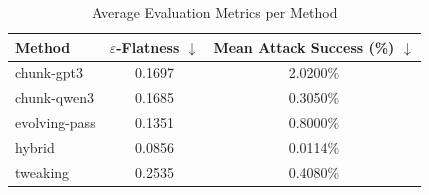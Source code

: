 \begin{table}[h]
\centering
\caption{Average Evaluation Metrics per Method}
\label{tab:honeyword-metrics}
\begin{tabular}{lcc}
\hline
Method & $\varepsilon$-Flatness $\downarrow$ & Mean Attack Success (\%) $\downarrow$ \\
\hline
  chunk-gpt3 & 0.1697 & 2.0200\% \\
  chunk-qwen3 & 0.1685 & 0.3050\% \\
  evolving-pass & 0.1351 & 0.8000\% \\
  hybrid & 0.0856 & 0.0114\% \\
  tweaking & 0.2535 & 0.4080\% \\
\hline
\end{tabular}
\end{table}